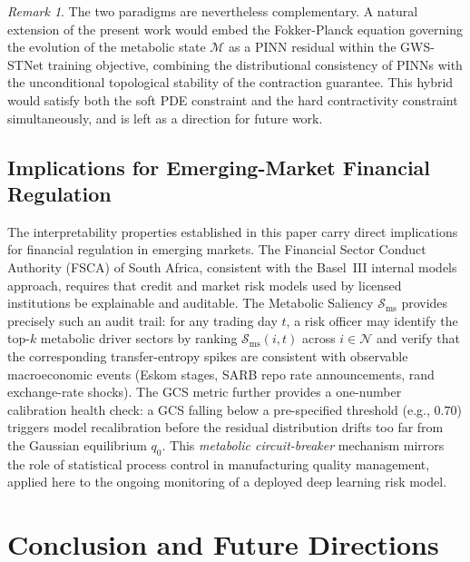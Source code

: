 \documentclass[11pt,a4paper]{article}  %
\theoremstyle{plain}
\theoremstyle{definition}
\theoremstyle{remark}
\newtheorem{remark}{Remark}[section]
\begin{document}
\begin{remark}
The two paradigms are nevertheless complementary. A natural
extension of the present work would embed the Fokker-Planck
equation governing the evolution of the metabolic state
$\mathcal{M}$ as a PINN residual within the GWS-STNet training
objective, combining the distributional consistency of PINNs
with the unconditional topological stability of the contraction
guarantee. This hybrid would satisfy both the soft PDE constraint
and the hard contractivity constraint simultaneously, and is left
as a direction for future work.
\end{remark}

\subsection{Implications for Emerging-Market Financial Regulation}
\label{subsec:regulation}

The interpretability properties established in this paper carry direct
implications for financial regulation in emerging markets. The
Financial Sector Conduct Authority (FSCA) of South Africa, consistent
with the Basel~III internal models approach, requires that
credit and market risk models used by licensed institutions be
explainable and auditable. The Metabolic Saliency $\mathcal{S}_{\mathrm{ms}}$
provides precisely such an audit trail: for any trading day $t$,
a risk officer may identify the top-$k$ metabolic driver sectors
by ranking $\mathcal{S}_{\mathrm{ms}}(i,t)$ across $i\in\mathcal{N}$
and verify that the corresponding transfer-entropy spikes are
consistent with observable macroeconomic events (Eskom stages,
SARB repo rate announcements, rand exchange-rate shocks). The
GCS metric further provides a one-number calibration health check:
a GCS falling below a pre-specified threshold (e.g., $0.70$)
triggers model recalibration before the residual distribution
drifts too far from the Gaussian equilibrium $q_0$. This
\emph{metabolic circuit-breaker} mechanism mirrors the role of
statistical process control in manufacturing quality management,
applied here to the ongoing monitoring of a deployed deep learning
risk model.

\section{Conclusion and Future Directions}
\label{sec:conclusion}
\end{document}
